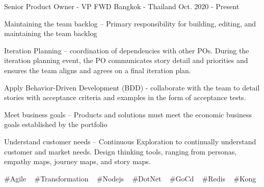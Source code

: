 

\begin{cventries}

  \cventry
    {Senior Product Owner - VP} %
    {FWD} %
    {Bangkok - Thailand} %
    {Oct. 2020 - Present} %
    {
      \begin{cvitems} %
        \item {Maintaining the team backlog – Primary responsibility for building, editing, and maintaining the team backlog}
        \item {Iteration Planning – coordination of dependencies with other POs. During the iteration planning event, the PO communicates story detail and priorities and ensures the team aligns and agrees on a final iteration plan.}
        \item {Apply Behavior-Driven Development (BDD) - collaborate with the team to detail stories with acceptance criteria and examples in the form of acceptance tests.}
        \item {Meet business goals – Products and solutions must meet the economic business goals established by the portfolio}
        \item {Understand customer needs – Continuous Exploration to continually understand customer and market needs. Design thinking tools, ranging from personas, empathy maps, journey maps, and story maps.}
      \end{cvitems}
    }
    {
      \#Agile ~
      \#Transformation ~
      \#Nodejs ~
      \#DotNet ~
      \#GoCd ~
      \#Redis ~
      \#Kong ~
    }


\end{cventries}
